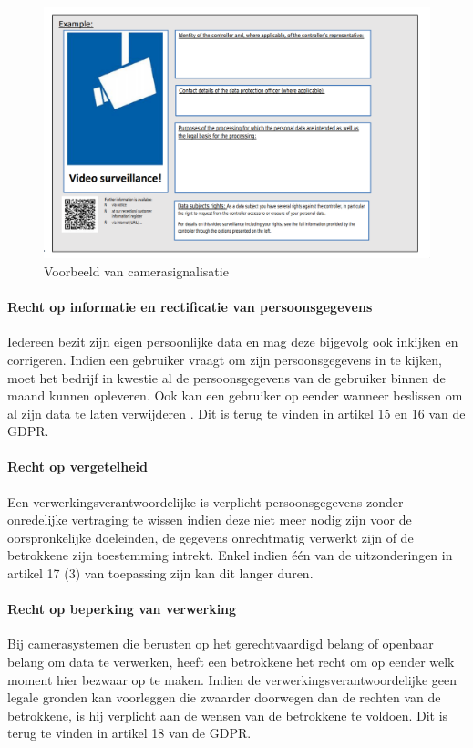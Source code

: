 \begin{figure}[h!]
	\centering
	\includegraphics[width=\linewidth]{img/anpr-aanduiding.png}
	\caption{Voorbeeld van camerasignalisatie \autocite{edpb2019guidelines}}
	\label{anpr-aanduiding}
\end{figure}

\paragraph{Recht op informatie en rectificatie van persoonsgegevens} 
Iedereen bezit zijn eigen persoonlijke data en mag deze bijgevolg ook inkijken en corrigeren. Indien een gebruiker vraagt om zijn persoonsgegevens in te kijken, moet het bedrijf in kwestie al de persoonsgegevens van de gebruiker binnen de maand kunnen opleveren. Ook kan een gebruiker op eender wanneer beslissen om al zijn data te laten verwijderen \autocite{avg2018privacy}. Dit is terug te vinden in artikel 15 en 16 van de GDPR.

\paragraph{Recht op vergetelheid}
Een verwerkingsverantwoordelijke is verplicht persoonsgegevens zonder onredelijke vertraging te wissen indien deze niet meer nodig zijn voor de oorspronkelijke doeleinden, de gegevens onrechtmatig verwerkt zijn of de betrokkene zijn toestemming intrekt. Enkel indien één van de uitzonderingen in artikel 17 (3) van toepassing zijn kan dit langer duren. \autocite{edpb2019guidelines}

\paragraph{Recht op beperking van verwerking}
Bij camerasystemen die berusten op het gerechtvaardigd belang of openbaar belang om data te verwerken, heeft een betrokkene het recht om op eender welk moment hier bezwaar op te maken. Indien de verwerkingsverantwoordelijke geen legale gronden kan voorleggen die zwaarder doorwegen dan de rechten van de betrokkene, is hij verplicht aan de wensen van de betrokkene te voldoen. Dit is terug te vinden in artikel 18 van de GDPR.

